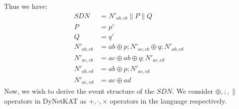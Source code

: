 \begin{example}
    Thus we have:
    \begin{align*}
        SDN & = N'_{ab,cb} \parallel P \parallel Q \\
        P & = p' \\
        Q & = q' \\
        N'_{ab,cb} & = ab \oplus p;N'_{ac,cb} \oplus q;N'_{ab,cd} \\
        N'_{ac,cb} & = ac \oplus ab \oplus q;N'_{ac,cd}   \\
        N'_{ab,cd} & = ab \oplus p;N'_{ac,cd}             \\
        N'_{ac,cd} & = ac \oplus ad 
    \end{align*}
    Now, we wish to derive the event structure of the $SDN$.
    We consider $\oplus, ;, \parallel$ operators in DyNetKAT as 
    $+,\cdot,\times$ operators in the language respectively.


\end{example}
